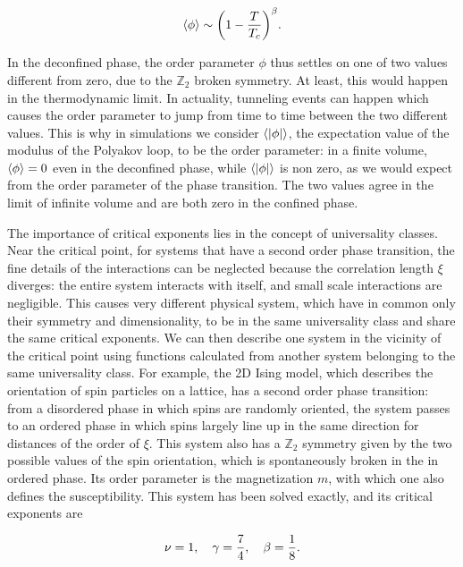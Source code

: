 \documentclass[reqno,12pt]{article}
\numberwithin{equation}{section}
\begin{document}
\begin{equation}
	\expval{\phi} \sim \qty(1 - \frac{T}{T_c})^\beta.
\end{equation}

In the deconfined phase, the order parameter $\phi$ thus settles on one of two values different from zero, due to
the $\mathbb{Z}_2$ broken symmetry. At least, this would happen in the thermodynamic limit. In actuality, tunneling events
can happen which causes the order parameter to jump from time to time between the two different values. This is
why in simulations we consider $\expval{|\phi|}$, the expectation value of the modulus of the Polyakov loop, to be the
order parameter: in a finite volume, $\expval{\phi} = 0$ even in the deconfined phase, while $\expval{|\phi|}$ is
non zero, as we would expect from the order parameter of the phase transition. 
The two values agree in the limit of infinite volume and are both zero in the confined phase. 

The importance of critical exponents lies in the concept of universality classes. Near the critical point, for systems
that have a second order phase transition, the fine details of the interactions can be neglected because the correlation
length $\xi$ diverges: the entire system interacts with itself, and small scale interactions are negligible. This causes
very different physical system, which have in common only their symmetry and dimensionality, to be in the same universality 
class and share the same critical exponents. We can then describe one system in the vicinity of the critical point using
functions calculated from another system belonging to the same universality class. For example, the 2D Ising model, which
describes the orientation of spin particles on a lattice, has a second order phase transition: from a disordered phase in
which spins are randomly oriented, the system passes to an ordered phase in which spins largely
line up in the same direction for distances of the order of $\xi$. This system also has a $\mathbb{Z}_2$ symmetry
given by the two possible values of the spin orientation, which is spontaneously broken in the in ordered phase. 
Its order parameter is the magnetization $m$, with which one also defines the susceptibility. This system has been
solved exactly, and its critical exponents are 

\begin{equation} \label{eq:critical_exponents}
	\nu = 1 \qc \gamma = \frac{7}{4} \qc \beta = \frac{1}{8}. 
\end{equation}
\end{document}
